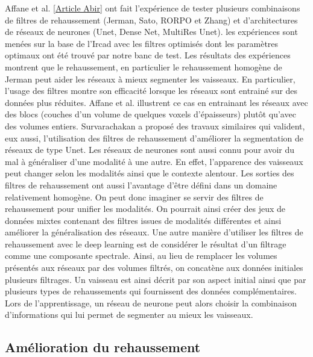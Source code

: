 Affane et al. \ref{Article Abir} ont fait l'expérience de tester plusieurs combinaisons de filtres de rehaussement (Jerman, Sato, RORPO et Zhang) et d'architectures de réseaux de neurones (Unet, Dense Net, MultiRes Unet). les expériences sont menées sur la base de l'Ircad avec les filtres optimisés dont les paramètres optimaux ont été trouvé par notre banc de test. Les résultats des expériences montrent que le rehaussement, en particulier le rehaussement homogène de Jerman peut aider les réseaux à mieux segmenter les vaisseaux. En particulier, l'usage des filtres montre son efficacité lorsque les réseaux sont entrainé sur des données plus réduites. Affane et al. illustrent ce cas en entrainant les réseaux avec des blocs (couches d'un volume de quelques voxels d'épaisseurs) plutôt qu'avec des volumes entiers. Survarachakan \cite{Survarachakan2021_deep_vesselness} a proposé des travaux similaires qui valident, eux aussi, l'utilisation des filtres de rehaussement d'améliorer la segmentation de réseaux de type Unet.
Les réseaux de neurones sont aussi connu pour avoir du mal à généraliser d'une modalité à une autre. En effet, l'apparence des vaisseaux peut changer selon les modalités ainsi que le contexte alentour. Les sorties des filtres de rehaussement ont aussi l'avantage d'être défini dans un domaine relativement homogène. On peut donc imaginer se servir des filtres de rehaussement pour unifier les modalités. On pourrait ainsi créer des jeux de données mixtes contenant des filtres issues de modalités différentes et ainsi améliorer la généralisation des réseaux.
Une autre manière d'utiliser les filtres de rehaussement avec le deep learning est de considérer le résultat d'un filtrage comme une composante spectrale. Ainsi, au lieu de remplacer les volumes présentés aux réseaux par des volumes filtrés, on concatène aux données initiales plusieurs filtrages. Un vaisseau est ainsi décrit par son aspect initial ainsi que par plusieurs types de rehaussements qui fournissent des données complémentaires. Lors de l'apprentissage, un réseau de neurone peut alors choisir la combinaison d'informations qui lui permet de segmenter au mieux les vaisseaux.

\subsection{Amélioration du rehaussement}


